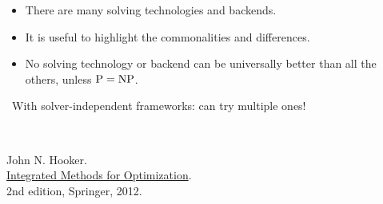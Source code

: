 \documentclass{cons-beamer}
\begin{document}
\begin{frame}
  \begin{itemize}
    \item There are many solving technologies and backends.
    \item It is useful to highlight the commonalities and differences.
    \item No solving technology or backend can be universally better
      than all the others, unless $\textnormal{P} = \textnormal{NP}$.
  \end{itemize}
  \begin{center}
    \handpoint\ With solver-independent frameworks: can try multiple ones!
  \end{center}

   \\
  \begin{thebibliography}{99}
    \beamertemplatebookbibitems
   John N. Hooker. \\
    \href{https://link.springer.com/book/10.1007\%2F978-1-4614-1900-6}{Integrated Methods for Optimization}. \\
    2nd edition, Springer, 2012.
  \end{thebibliography}
\end{frame}
\end{document}
